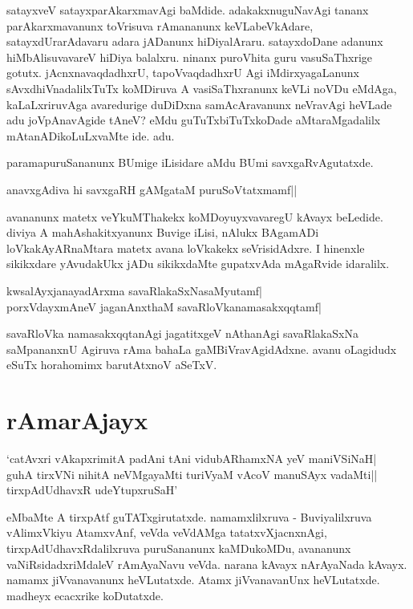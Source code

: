 satayxveV satayxparAkarxmavAgi baMdide. adakakxnuguNavAgi tananx parAkarxmavanunx toVrisuva rAmananunx keVLabeVkAdare, satayxdUrarAdavaru adara jADanunx hiDiyalAraru. satayxdoDane adanunx hiMbAlisuvavareV hiDiya balalxru. ninanx puroVhita guru vasuSaThxrige gotutx. jAcnxnavaqdadhxrU, tapoVvaqdadhxrU Agi iMdirxyagaLanunx sAvxdhiVnadalilxTuTx koMDiruva A vasiSaThxranunx keVLi noVDu eMdAga, kaLaLxriruvAga avaredurige duDiDxna samAcAravanunx neVravAgi heVLade adu joVpAnavAgide tAneV? eMdu guTuTxbiTuTxkoDade aMtaraMgadalilx mAtanADikoLuLxvaMte ide. adu. 

paramapuruSananunx BUmige iLisidare aMdu BUmi savxgaRvAgutatxde. 

\begin{shloka}
anavxgAdiva hi savxgaRH gAMgataM puruSoVtatxmamf||
\end{shloka}

avananunx matetx veYkuMThakekx koMDoyuyxvavaregU kAvayx beLedide. diviya A mahAshakitxyanunx Buvige iLisi, nAlukx BAgamADi loVkakAyARnaMtara matetx avana loVkakekx seVrisidAdxre. I hinenxle sikikxdare yAvudakUkx jADu sikikxdaMte gupatxvAda mAgaRvide idaralilx. 

\begin{shloka}
kwsalAyx\s janayadArxma‌ savaRlakaSxNasaMyutamf|\label{252}\\
porxVdayxmAneV jaganAnxthaM savaRloVkanamasakxqqtamf|
\end{shloka}

savaRloVka namasakxqqtanAgi jagatitxgeV nAthanAgi savaRlakaSxNa saMpananxnU Agiruva rAma bahaLa gaMBiVravAgidAdxne. avanu oLagidudx eSuTx horahomimx barutAtxnoV aSeTxV. 

\section*{rAmarAjayx}

\begin{shloka}
`catAvxri vAkapxrimitA padAni tAni vidubARhamxNA yeV maniVSiNaH|\\
guhA tirxVNi nihitA neVMgayaMti turiVyaM vAcoV manuSAyx vadaMti||\\
tirxpAdUdhavxR udeYtupxruSaH'\label{252a}
\end{shloka}

eMbaMte A tirxpAtf guTATxgirutatxde. namamxlilxruva - Buviyalilxruva vAlimxVkiyu AtamxvAnf, veVda veVdAMga tatatxvXjacnxnAgi, tirxpAdUdhavxRdalilxruva puruSananunx kaMDukoMDu, avananunx vaNiRsidadxriMdaleV rAmAyaNavu veVda. narana kAvayx nArAyaNada kAvayx. namamx jiVvanavanunx heVLutatxde. Atamx jiVvanavanUnx heVLutatxde. madheyx ecacxrike koDutatxde. 

